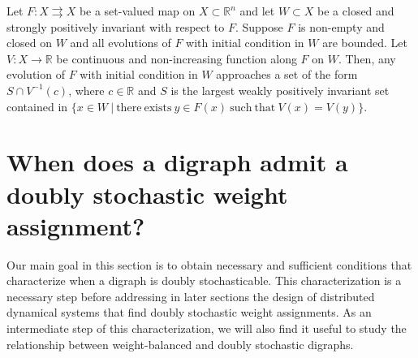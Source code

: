 \documentclass[final]{siamltex}
\begin{document}
\begin{theorem}\label{theorem:LaSalle}
  Let ${{F}:{X} {\rightrightarrows} {X}}$ be a set-valued map on $ X \subset
  \mathbb{R}^n $ and let $ W \subset X $ be a closed and strongly
  positively invariant with respect to $ F $.  Suppose $ F $ is
  non-empty and closed on $ W $ and all evolutions of $ F $ with
  initial condition in $ W $ are bounded. Let $ V: X\rightarrow
  \mathbb{R}$ be continuous and non-increasing function along $ F $ on
  $ W$. Then, any evolution of $F$ with initial condition in $ W $
  approaches a set of the form $ S \cap V^{-1}(c) $, where $ c \in
  \mathbb{R} $ and $ S $ is the largest weakly positively invariant
  set contained in $ \{x \in W \ | \ \mathrm{there} \ \mathrm{exists}
  \ y \in F(x) \ \mathrm{such} \ \mathrm{that} \ V(x)=V(y)\} $.
\end{theorem}

\section{When does a digraph admit a doubly stochastic weight
  assignment?}\label{section:doubly_stochastic_sec}

Our main goal in this section is to obtain necessary and sufficient
conditions that characterize when a digraph is doubly
stochasticable. This characterization is a necessary step before
addressing in later sections the design of distributed dynamical
systems that find doubly stochastic weight assignments. As an
intermediate step of this characterization, we will also find it
useful to study the relationship between weight-balanced and doubly
stochastic digraphs.
\end{document}
